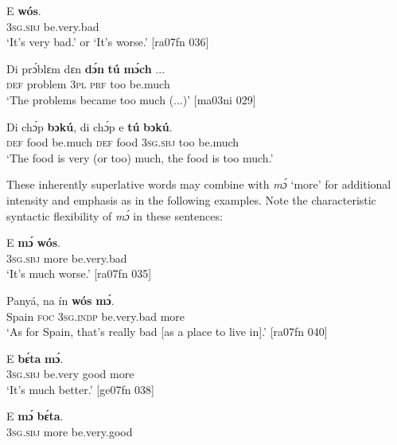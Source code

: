 \ea%
    \label{ex:key:498}
    \gll E    \textbf{wós}.\\
\textsc{3sg.sbj}  be.very.bad\\

\glt ‘It’s very bad.’ or ‘It’s worse.’ [ra07fn 036]
\z


\ea%
    \label{ex:key:499}
    \gll Di  prɔ́blɛm  dɛn  \textbf{dɔ́n}  \textbf{tú}  \textbf{mɔ́ch}  \op...\cp{}\\
\textsc{def}  problem  \textsc{3pl}  \textsc{prf}  too  be.much\\

\glt ‘The problems became too much (...)’ [ma03ni 029]
\z


\ea%
    \label{ex:key:500}
    \gll Di  chɔ́p  \textbf{bɔkú},  di  chɔ́p  e    \textbf{tú}  \textbf{bɔkú}.\\
\textsc{def}  food    be.much  \textsc{def}  food    \textsc{3sg.sbj}  too  be.much\\
\glt ‘The food is very (or too) much, the food is too much.’
\z

These inherently superlative words may combine with \textit{mɔ́} ‘more’ for additional intensity and emphasis as in the following examples. Note the characteristic syntactic flexibility of \textit{mɔ́} in these sentences: 


\ea%
    \label{ex:key:501}
    \gll E    \textbf{mɔ́}    \textbf{wós}.\\
\textsc{3sg.sbj}  more  be.very.bad\\

\glt ‘It’s much worse.’ [ra07fn 035]
\z


\ea%
    \label{ex:key:502}
    \gll Panyá,  na  ín    \textbf{wós}      \textbf{mɔ́}.\\
Spain  \textsc{foc}  \textsc{3sg.indp}  be.very.bad  more\\

\glt ‘As for Spain, that’s really bad [as a place to live in].’ [ra07fn 040]
\z


\ea%
    \label{ex:key:503}
    \gll E    \textbf{bɛ́ta}      \textbf{mɔ́}.\\
\textsc{3sg.sbj}  be.very good  more\\

\glt ‘It’s much better.’ [ge07fn 038]
\z


\ea%
    \label{ex:key:504}
    \gll E    \textbf{mɔ́}    \textbf{bɛ́ta}.\\
\textsc{3sg.sbj}  more  be.very.good\\

